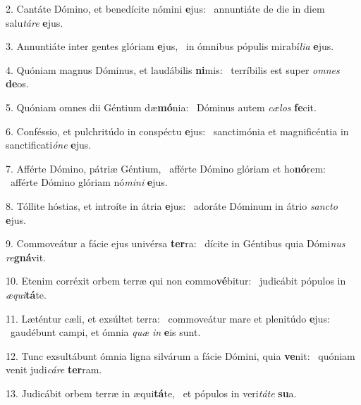 2. Cantáte Dómino, et benedícite nómini \textbf{e}jus: \ast\  annuntiáte de die in diem salu\textit{tá}\textit{re} \textbf{e}jus.\

3. Annuntiáte inter gentes glóriam \textbf{e}jus, \ast\  in ómnibus pópulis mirabí\textit{li}\textit{a} \textbf{e}jus.\

4. Quóniam magnus Dóminus, et laudábilis \textbf{ni}mis: \ast\  terríbilis est super \textit{om}\textit{nes} \textbf{de}os.\

5. Quóniam omnes dii Géntium dæ\textbf{mó}nia: \ast\  Dóminus autem \textit{cæ}\textit{los} \textbf{fe}cit.\

6. Conféssio, et pulchritúdo in conspéctu \textbf{e}jus: \ast\  sanctimónia et magnificéntia in sanctificati\textit{ó}\textit{ne} \textbf{e}jus.\

7. Afférte Dómino, pátriæ Géntium, \dag\  afférte Dómino glóriam et ho\textbf{nó}rem: \ast\  afférte Dómino glóriam nó\textit{mi}\textit{ni} \textbf{e}jus.\

8. Tóllite hóstias, et introíte in átria \textbf{e}jus: \ast\  adoráte Dóminum in átrio \textit{sanc}\textit{to} \textbf{e}jus.\

9. Commoveátur a fácie ejus univérsa \textbf{ter}ra: \ast\  dícite in Géntibus quia Dómi\textit{nus} \textit{re}\textbf{gná}vit.\

10. Etenim corréxit orbem terræ qui non commo\textbf{vé}bitur: \ast\  judicábit pópulos in \textit{æ}\textit{qui}\textbf{tá}te.\

11. Læténtur cæli, et exsúltet terra: \dag\  commoveátur mare et plenitúdo \textbf{e}jus: \ast\  gaudébunt campi, et ómnia \textit{quæ} \textit{in} \textbf{e}is sunt.\

12. Tunc exsultábunt ómnia ligna silvárum a fácie Dómini, quia \textbf{ve}nit: \ast\  quóniam venit judi\textit{cá}\textit{re} \textbf{ter}ram.\

13. Judicábit orbem terræ in æqui\textbf{tá}te, \ast\  et pópulos in veri\textit{tá}\textit{te} \textbf{su}a.\

